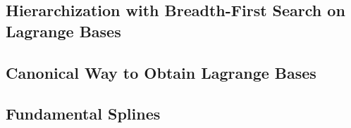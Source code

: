 \label{sec:44spatAdaptiveBFS}

\blindtext{}



\subsection{Hierarchization with Breadth-First Search on Lagrange Bases}
\label{sec:441bfsLagrangeBases}

\blindtext{}



\subsection{Canonical Way to Obtain Lagrange Bases}
\label{sec:442constructionLagrangeBases}

\blindtext{}



\subsection{Fundamental Splines}
\label{sec:443fundamentalSplines}

\blindtext{}
